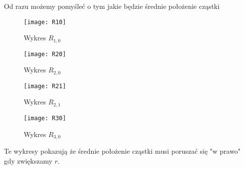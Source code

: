Od razu możemy pomyśleć o tym jakie będzie średnie położenie cząstki
\begin{figure}[htb]
	\centering
	\begin{minipage}[t]{0.47\textwidth}
		\centering
		\texttt{[image: R10]}
		\caption{Wykres $R_{1, 0}$}
		\label{fig:R10}
	\end{minipage}
	\hspace{0.04\textwidth}
	\begin{minipage}[t]{0.47\textwidth}
		\centering
		\texttt{[image: R20]}
		\caption{Wykres $R_{2, 0}$}
		\label{fig:R20}
	\end{minipage}
\end{figure}
\begin{figure}[htb]
	\centering
	\begin{minipage}[t]{0.47\textwidth}
		\centering
		\texttt{[image: R21]}
		\caption{Wykres $R_{2, 1}$}
		\label{fig:R21}
	\end{minipage}
	\hspace{0.04\textwidth}
	\begin{minipage}[t]{0.47\textwidth}
		\centering
		\texttt{[image: R30]}
		\caption{Wykres $R_{3, 0}$}
		\label{fig:R30}
	\end{minipage}
\end{figure}
Te wykresy pokazują że średnie położenie cząstki musi poruszać się "w prawo" gdy zwiększamy $r$.

